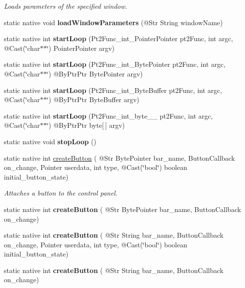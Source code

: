 \begin{DoxyCompactItemize}
\begin{DoxyCompactList}\small\item\em Loads parameters of the specified window. \end{DoxyCompactList}\item 
static native void {\bfseries load\+Window\+Parameters} (@Str String window\+Name)
\item 
static native int {\bfseries start\+Loop} (Pt2\+Func\+\_\+int\+\_\+\+Pointer\+Pointer pt2\+Func, int argc, @Cast(\char`\"{}char$\ast$$\ast$\char`\"{}) Pointer\+Pointer argv)
\item 
static native int {\bfseries start\+Loop} (Pt2\+Func\+\_\+int\+\_\+\+Byte\+Pointer pt2\+Func, int argc, @Cast(\char`\"{}char$\ast$$\ast$\char`\"{}) @By\+Ptr\+Ptr Byte\+Pointer argv)
\item 
static native int {\bfseries start\+Loop} (Pt2\+Func\+\_\+int\+\_\+\+Byte\+Buffer pt2\+Func, int argc, @Cast(\char`\"{}char$\ast$$\ast$\char`\"{}) @By\+Ptr\+Ptr Byte\+Buffer argv)
\item 
static native int {\bfseries start\+Loop} (Pt2\+Func\+\_\+int\+\_\+byte\+\_\+\+\_\+ pt2\+Func, int argc, @Cast(\char`\"{}char$\ast$$\ast$\char`\"{}) @By\+Ptr\+Ptr byte\mbox{[}$\,$\mbox{]} argv)
\item 
static native void {\bfseries stop\+Loop} ()
\item 
static native int \hyperlink{group__highgui__qt_ga5dc4aba06e0c07797e0dcc3dc0920d4c}{create\+Button} ( @Str Byte\+Pointer bar\+\_\+name, Button\+Callback on\+\_\+change, Pointer userdata, int type, @Cast(\char`\"{}bool\char`\"{}) boolean initial\+\_\+button\+\_\+state)
\begin{DoxyCompactList}\small\item\em Attaches a button to the control panel. \end{DoxyCompactList}\item 
static native int {\bfseries create\+Button} ( @Str Byte\+Pointer bar\+\_\+name, Button\+Callback on\+\_\+change)
\item 
static native int {\bfseries create\+Button} ( @Str String bar\+\_\+name, Button\+Callback on\+\_\+change, Pointer userdata, int type, @Cast(\char`\"{}bool\char`\"{}) boolean initial\+\_\+button\+\_\+state)
\item 
static native int {\bfseries create\+Button} ( @Str String bar\+\_\+name, Button\+Callback on\+\_\+change)
\end{DoxyCompactItemize}
